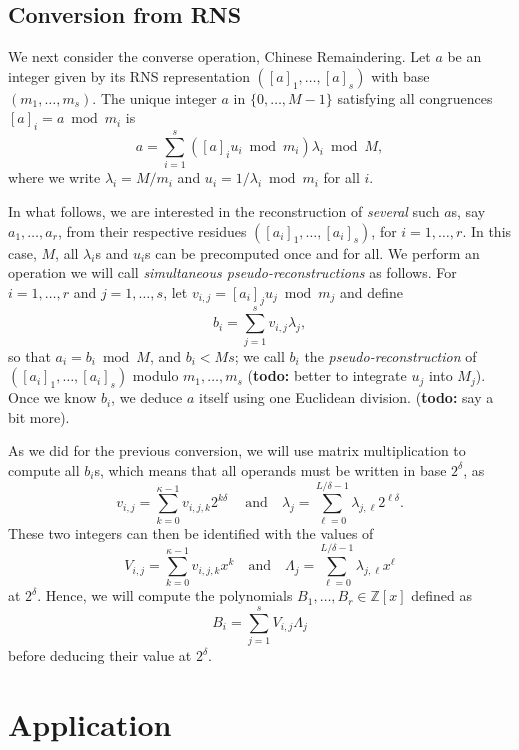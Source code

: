 \documentclass[acmtoms]{acmsmall}
\def\Z{\mathbb{Z}}
\newcommand{\todo}[1]{(\textbf{todo:} #1)}
\begin{document}

\subsection{Conversion from RNS}

We next consider the converse operation, Chinese Remaindering.
Let $a$ be an integer given by its RNS representation $([a]_1, \dots,
[a]_s)$ with base $(m_1,\dots,m_s)$. The unique integer $a$ in
$\{0,\dots,M-1\}$ satisfying all congruences $[a]_i = a \bmod m_i$ 
is
\begin{equation}\label{eq:cra}
a = \sum_{i=1}^s \left( [a]_i u_i \bmod m_i\right) \lambda_i  \bmod M,
\end{equation}
where we write $\lambda_i = M/m_i$ and $u_i = 1/\lambda_i \bmod m_i$ for all
$i$. 

In what follows, we are interested in the reconstruction of {\em
  several} such $a$s, say $a_1,\dots,a_r$, from their respective
residues $([a_i]_1, \dots, [a_i]_s)$, for $i=1,\dots,r$.  In this
case, $M$, all $\lambda_i$s and $u_i$s can be precomputed once and for
all.  We perform an operation we will call \textit{simultaneous
  pseudo-reconstructions} as follows.  For $i=1,\dots,r$ and
$j=1,\dots,s$, let $v_{i,j} = [a_i]_{j} u_j \bmod m_j$ and define
\[
b_i = \sum_{j=1}^s v_{i,j} \lambda_j,
\]
so that $a_i = b_i \bmod M$, and $b_i < M s$; we call $b_i$ the {\em
  pseudo-reconstruction} of $([a_i]_1,\dots,[a_i]_s)$ modulo $m_1,
\ldots, m_s$ \todo{better to integrate $u_j$ into $M_j$}. Once we know
$b_i$, we deduce $a$ itself using one Euclidean division. \todo{say a
  bit more}.

As we did for the previous conversion, we will use matrix
multiplication to compute all $b_i$s, which means that all operands
must be written in base $2^\delta$, as
\[v_{i,j} = \sum_{k=0}^{\kappa-1} v_{i,j,k}2^{k \delta}\
\quad\text{and}\quad
\lambda_j = \sum_{\ell = 0}^{L/\delta-1} \lambda_{j,\ell}2^{\ell \delta}.\]
These two integers can then be identified with the values of 
\[V_{i,j} = \sum_{k=0}^{\kappa-1} v_{i,j,k}x^{k}
\quad\text{and}\quad
\Lambda_j = \sum_{\ell = 0}^{L/\delta-1} \lambda_{j,\ell}x^{\ell}\]
at $2^\delta$. Hence, we will compute the polynomials 
$B_1,\dots,B_r \in \Z[x]$ defined as 
\[B_i = \sum_{j=1}^s V_{i,j} \Lambda_j\]
before deducing their value at $2^\delta$. 

\section{Application}
\end{document}

